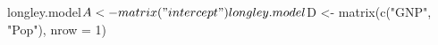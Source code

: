 \begin{Schunk}
\begin{Sinput}
 longley.model$A <- matrix("intercept")
 longley.model$D <- matrix(c("GNP", "Pop"), nrow = 1)
\end{Sinput}
\end{Schunk}
